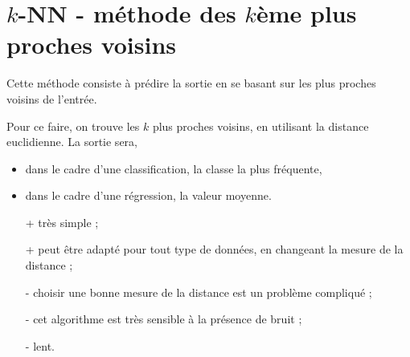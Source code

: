 \chapter{$k$-NN - méthode des $k$ème plus proches voisins}
		
Cette méthode consiste à prédire la sortie en se basant sur les plus proches voisins de l'entrée.
		
		
Pour ce faire, on trouve les $k$ plus proches voisins, en utilisant la distance euclidienne. La sortie sera,
		
\begin{itemize}
	\item dans le cadre d'une classification, la classe la plus fréquente,
	\item dans le cadre d'une régression, la valeur moyenne.
\end{itemize}
		
		
\begin{itemize}
	\item[+] très simple ;
	\item[+] peut être adapté pour tout type de données, en changeant la mesure de la distance ;
	\item[-] choisir une bonne mesure de la distance est un problème compliqué ;
	\item[-] cet algorithme est très sensible à la présence de bruit ;
	\item[-] lent.
\end{itemize}